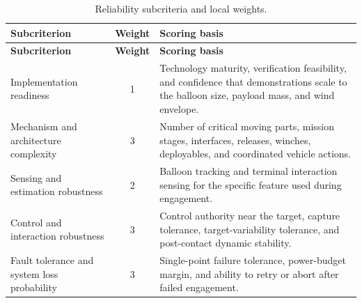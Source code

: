 {
\small
\setlength{\LTleft}{0pt}
\setlength{\LTright}{0pt}

\begin{longtable}{@{}p{} c p{}@{}}
\caption{Reliability subcriteria and local weights.}
\label{tab:reliability_subcriteria_weights} \\
\toprule
\textbf{Subcriterion} & \textbf{Weight} & \textbf{Scoring basis} \\
\midrule
\endfirsthead

\toprule
\textbf{Subcriterion} & \textbf{Weight} & \textbf{Scoring basis} \\
\midrule
\endhead

\bottomrule
\endfoot

Implementation readiness & 1 & Technology maturity, verification feasibility, and confidence that demonstrations scale to the balloon size, payload mass, and wind envelope. \\
Mechanism and architecture complexity & 3 & Number of critical moving parts, mission stages, interfaces, releases, winches, deployables, and coordinated vehicle actions. \\
Sensing and estimation robustness & 2 & Balloon tracking and terminal interaction sensing for the specific feature used during engagement. \\
Control and interaction robustness & 3 & Control authority near the target, capture tolerance, target-variability tolerance, and post-contact dynamic stability. \\
Fault tolerance and system loss probability & 3 & Single-point failure tolerance, power-budget margin, and ability to retry or abort after failed engagement. \\

\bottomrule
\end{longtable}
}

